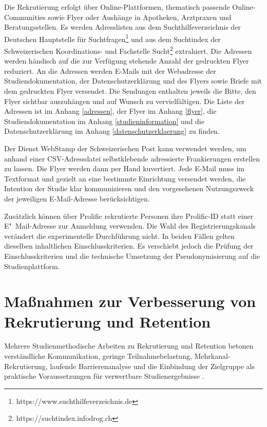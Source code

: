 Die Rekrutierung erfolgt über Online-Plattformen, thematisch passende Online-Communities sowie Flyer oder Aushänge in Apotheken, Arztpraxen und Beratungsstellen. Es werden Adresslisten aus dem Suchthilfeverzeichnis der Deutschen Hauptstelle für Suchtfragen\footnote{https://www.suchthilfeverzeichnis.de} und aus dem Suchtindex der Schweizerischen Koordinations- und Fachstelle Sucht\footnote{https://suchtindex.infodrog.ch} extrahiert. Die Adressen werden händisch auf die zur Verfügung stehende Anzahl der gedruckten Flyer reduziert. An die Adressen werden E-Mails mit der Webadresse der Studiendokumentation, der Datenschutzerklärung und des Flyers sowie Briefe mit dem gedruckten Flyer versendet. Die Sendungen enthalten jeweils die Bitte, den Flyer sichtbar auszuhängen und auf Wunsch zu vervielfältigen. Die Liste der Adressen ist im Anhang \ref{adressen}, der Flyer im Anhang \ref{flyer}, die Studiendokumentation im Anhang \ref{studieninformation} und die Datenschutzerklärung im Anhang \ref{datenschutzerklaerung} zu finden.

Der Dienst WebStamp der Schweizerischen Post kann verwendet werden, um anhand einer CSV-Adressdatei selbstklebende adressierte Frankierungen erstellen zu lassen. Die Flyer werden dann per Hand kuvertiert. Jede E-Mail muss im Textformat und gezielt an eine bestimmte Einrichtung versendet werden, die Intention der Studie klar kommunizieren und den vorgesehenen Nutzungszweck der jeweiligen E-Mail-Adresse berücksichtigen.

Zusätzlich können über Prolific rekrutierte Personen ihre Prolific-ID statt einer E"~Mail-Adresse zur Anmeldung verwenden. Die Wahl des Registrierungskanals verändert die experimentelle Durchführung nicht. In beiden Fällen gelten dieselben inhaltlichen Einschlusskriterien. Es ver\-schiebt jedoch die Prüfung der Einschlusskriterien und die technische Umsetzung der Pseudonymisierung auf die Studienplattform.

\section{Maßnahmen zur Verbesserung von Rekrutierung und Retention}

Mehrere Studienmethodische Arbeiten zu Rekrutierung und Retention betonen verständliche Kommunikation, geringe Teilnahmebelastung, Mehrkanal-Rekrutierung, laufende Barrierenanalyse und die Einbindung der Zielgruppe als praktische Voraussetzungen für verwertbare Studien\-ergebnisse \cite{parker2024press2protocol,klompstraChallengesStrategiesEffective2025,anastasiRecruitmentRetentionClinical2024}.

